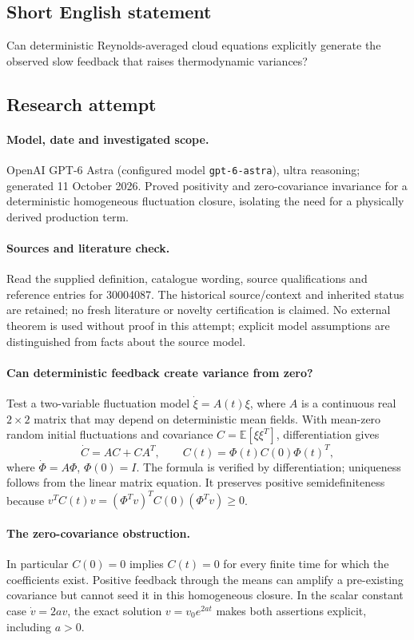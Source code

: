 \documentclass[11pt]{article}
\begin{document}
\subsection{Short English statement}
Can deterministic Reynolds-averaged cloud equations explicitly generate the observed slow feedback that raises thermodynamic variances?
\subsection{Research attempt}
\paragraph{Model, date and investigated scope.}
OpenAI GPT-6 Astra (configured model \texttt{gpt-6-astra}), ultra reasoning; generated 11 October 2026. Proved positivity and zero-covariance invariance for a deterministic homogeneous fluctuation closure, isolating the need for a physically derived production term.

\paragraph{Sources and literature check.}
Read the supplied definition, catalogue wording, source qualifications and reference entries for 30004087. The historical source/context and inherited status are retained; no fresh literature or novelty certification is claimed. No external theorem is used without proof in this attempt; explicit model assumptions are distinguished from facts about the source model.

\paragraph{Can deterministic feedback create variance from zero?} Test a two-variable fluctuation model \(\dot\xi=A(t)\xi\), where \(A\) is a continuous real \(2\times2\) matrix that may depend on deterministic mean fields. With mean-zero random initial fluctuations and covariance \(C=\mathbb E[\xi\xi^T]\), differentiation gives
\[
 \dot C=AC+CA^T,\qquad C(t)=\Phi(t)C(0)\Phi(t)^T,
\]
where \(\dot\Phi=A\Phi\), \(\Phi(0)=I\). The formula is verified by differentiation; uniqueness follows from the linear matrix equation. It preserves positive semidefiniteness because \(v^TC(t)v=(\Phi^Tv)^TC(0)(\Phi^Tv)\ge0\).
\paragraph{The zero-covariance obstruction.} In particular \(C(0)=0\) implies \(C(t)=0\) for every finite time for which the coefficients exist. Positive feedback through the means can amplify a pre-existing covariance but cannot seed it in this homogeneous closure. In the scalar constant case \(\dot v=2av\), the exact solution \(v=v_0e^{2at}\) makes both assertions explicit, including \(a>0\).
\end{document}
